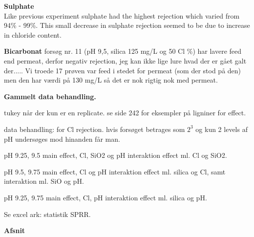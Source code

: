 \textbf{Sulphate}\\
Like previous experiment sulphate had the highest rejection which varied from 94\% - 99\%. 
This small decrease in sulphate rejection seemed to be due to increase in chloride content. 



\textbf{Bicarbonat}
forsøg nr. 11 (pH 9,5, silica 125 mg/L og 50 Cl \%) har lavere feed end permeat, derfor negativ rejection, jeg kan ikke lige lure hvad der er gået galt der..... 
Vi troede 17 prøven var feed i stedet for permeat (som der stod på den) men den har værdi på 130 mg/L så det er nok rigtig nok med permeat.










\textbf{Gammelt data behandling. }


tukey når der kun er en replicate. se side 242 for eksempler på ligniner for effect. 

data behandling: for Cl rejection. 
hvis forsøget betrages som $2^3$ og kun 2 levels af pH undersøges mod hinanden får man. 

pH 9.25, 9.5
main effect, Cl, SiO2 og pH
interaktion effect ml. Cl og SiO2. 

pH 9.5, 9.75
main effect, Cl og pH
interaktion effect ml. silica og Cl, samt interaktion ml. SiO og pH. 

pH 9.25, 9.75
main effect, Cl,  pH
interaktion effect ml. silica og pH. 

Se excel ark: statistik SPRR.

\textbf{Afsnit}\\

